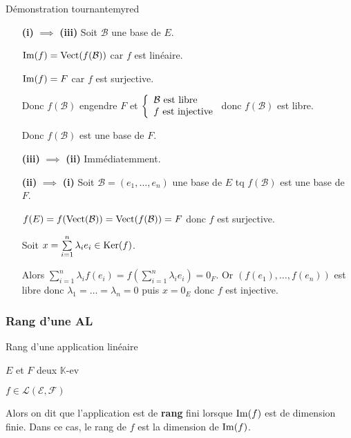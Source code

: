    \begin{demo}{Démonstration tournante}{myred}
        \begin{itemize}[leftmargin=3cm]
            \item[\textbf{(i)} $\implies$ \textbf{(iii)}] Soit $\mathcal{B}$ une base de $E$.
            
            $\operatorname{Im}(f) = \operatorname{Vect}(f(\mathcal{B}))$ car $f$ est linéaire. 
            
            $\operatorname{Im}(f) = F$ car $f$ est surjective.
            
            Donc $f(\mathcal{B})$ engendre $F$ et $\et{\mathcal{B} \text{ est libre}}{f \text{ est injective}}$ donc $f(\mathcal{B})$ est libre.
            
            Donc $f(\mathcal{B})$ est une base de $F$.
            \item[\textbf{(iii)} $\implies$ \textbf{(ii)}] Immédiatemment.
            \item[\textbf{(ii)} $\implies$ \textbf{(i)}] Soit $\mathcal{B} = (e_1, \ldots, e_n) $ une base de $E$ tq $f(\mathcal{B})$ est une base de $F$.
            
            $f(E) = f(\operatorname{Vect}(\mathcal{B})) = \operatorname{Vect}(f(\mathcal{B})) = F$ donc $f$ est surjective.
            
            Soit $x = \sum\limits_{i=1}^n \lambda_i e_i \in \operatorname{Ker}(f)$.
            
            Alors $\sum\limits_{i=1}^n \lambda_i f(e_i) = f \left( \sum\limits_{i=1}^n \lambda_i e_i\right) = 0_F$. Or $(f(e_1),\ldots, f(e_n))$ est libre donc $\lambda_1 = \ldots = \lambda_n = 0$ puis $x = 0_E$ donc $f$ est injective.
        \end{itemize}
    \end{demo}

    \subsubsection{Rang d’une AL}

    \begin{defi}{Rang d’une application linéaire}{}
        \begin{soient}
            \item $E$ et $F$ deux $\mathbb{K}$-ev
            \item $f \in \mathcal{L}(\mathcal{E},\mathcal{F})$
        \end{soient}
    
        Alors on dit que l’application est de \textbf{rang} fini lorsque $\operatorname{Im}(f)$ est de dimension finie. Dans ce cas, le rang de $f$ est la dimension de $\operatorname{Im}(f)$.
    \end{defi}
    
